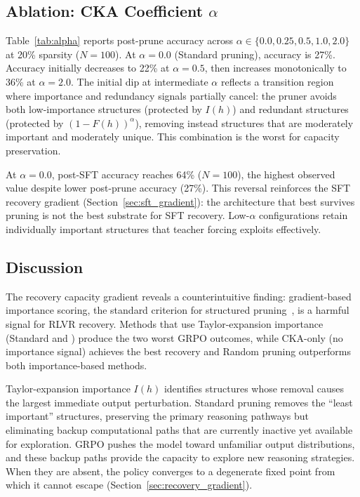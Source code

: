 \subsection{Ablation: CKA Coefficient $\alpha$}
\label{sec:ablation}



Table~\ref{tab:alpha} reports post-prune accuracy across $\alpha \in \{0.0, 0.25, 0.5, 1.0, 2.0\}$ at 20\% sparsity ($N{=}100$).
At $\alpha{=}0.0$ (Standard pruning), accuracy is 27\%.
Accuracy initially decreases to 22\% at $\alpha{=}0.5$, then increases monotonically to 36\% at $\alpha{=}2.0$.
The initial dip at intermediate $\alpha$ reflects a transition region where importance and redundancy signals partially cancel: the pruner avoids both low-importance structures (protected by $I(h)$) and redundant structures (protected by $(1-F(h))^\alpha$), removing instead structures that are moderately important and moderately unique.
This combination is the worst for capacity preservation.

At $\alpha{=}0.0$, post-SFT accuracy reaches 64\% ($N{=}100$), the highest observed value despite lower post-prune accuracy (27\%).
This reversal reinforces the SFT recovery gradient (Section~\ref{sec:sft_gradient}): the architecture that best survives pruning is not the best substrate for SFT recovery.
Low-$\alpha$ configurations retain individually important structures that teacher forcing exploits effectively.


\subsection{Discussion}
\label{sec:discussion}

The recovery capacity gradient reveals a counterintuitive finding: gradient-based importance scoring, the standard criterion for structured pruning~\citep{llmpruner2023}, is a harmful signal for RLVR recovery.
Methods that use Taylor-expansion importance (Standard and \rasp{}) produce the two worst GRPO outcomes, while CKA-only (no importance signal) achieves the best recovery and Random pruning outperforms both importance-based methods.

Taylor-expansion importance $I(h)$ identifies structures whose removal causes the largest immediate output perturbation.
Standard pruning removes the ``least important'' structures, preserving the primary reasoning pathways but eliminating backup computational paths that are currently inactive yet available for exploration.
GRPO pushes the model toward unfamiliar output distributions, and these backup paths provide the capacity to explore new reasoning strategies.
When they are absent, the policy converges to a degenerate fixed point from which it cannot escape (Section~\ref{sec:recovery_gradient}).

